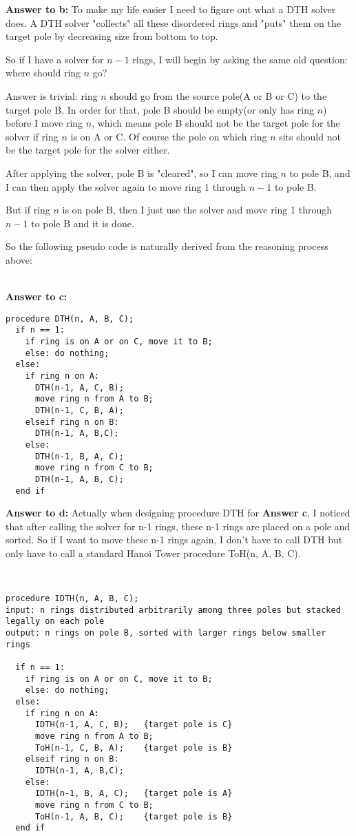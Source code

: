 \documentclass[a4paper,11pt]{article}
\theoremstyle{mytheor}
\begin{document}
\textbf{Answer to b:} To make my life easier I need to figure out what a DTH solver does. A DTH solver "collects" all these disordered rings and "puts" them on the target pole by decreasing size from bottom to top.

So if I have a solver for $n-1$ rings, I will begin by asking the same old question: where should ring $n$ go?

Answer is trivial: ring $n$ should go from the source pole(A or B or C) to the target pole B. In order for that, pole B should be empty(or only has ring $n$) before I move ring $n$, which means pole B should not be the target pole for the solver if ring $n$ is on A or C. Of course the pole on which ring $n$ sits should not be the target pole for the solver either.

After applying the solver, pole B is "cleared", so I can move ring $n$ to pole B, and I can then apply the solver again to move ring 1 through $n-1$ to pole B.

But if ring $n$ is on pole B, then I just use the solver and move ring 1 through $n-1$ to pole B and it is done.

So the following pseudo code is naturally derived from the reasoning process above:

~\\
\textbf{Answer to c:}
\begin{lstlisting}[label={list:second},caption=Disordered Towers Hanoi pseudo code.]
procedure DTH(n, A, B, C);
  if n == 1:
    if ring is on A or on C, move it to B;
    else: do nothing;
  else:
    if ring n on A:
      DTH(n-1, A, C, B);
      move ring n from A to B;
      DTH(n-1, C, B, A);
    elseif ring n on B:
      DTH(n-1, A, B,C);
    else:
      DTH(n-1, B, A, C);
      move ring n from C to B;
      DTH(n-1, A, B, C);
  end if
\end{lstlisting}

\textbf{Answer to d:} Actually when designing procedure DTH for \textbf{Answer c}, I noticed that after calling the solver for n-1 rings, these n-1 rings are placed on a pole and sorted. So if I want to move these n-1 rings again, I don't have to call DTH but only have to call a standard Hanoi Tower procedure ToH(n, A, B, C).

~\\

\begin{lstlisting}[label={list:third},caption=Improved Disordered Towers Hanoi pseudo code.]
procedure IDTH(n, A, B, C);
input: n rings distributed arbitrarily among three poles but stacked legally on each pole
output: n rings on pole B, sorted with larger rings below smaller rings

  if n == 1:
    if ring is on A or on C, move it to B;
    else: do nothing;
  else:
    if ring n on A:
      IDTH(n-1, A, C, B);   {target pole is C}
      move ring n from A to B;
      ToH(n-1, C, B, A);    {target pole is B}
    elseif ring n on B:
      IDTH(n-1, A, B,C);
    else:
      IDTH(n-1, B, A, C);   {target pole is A}
      move ring n from C to B;
      ToH(n-1, A, B, C);    {target pole is B}
  end if
\end{lstlisting}
\end{document}
